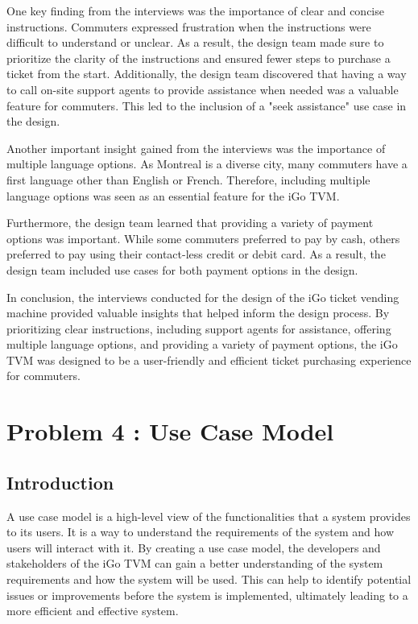 \documentclass[letterpaper]{report}
\begin{document}
One key finding from the interviews was the importance of clear and concise instructions. Commuters expressed frustration when the instructions were difficult to understand or unclear. As a result, the design team made sure to prioritize the clarity of the instructions and ensured fewer steps to purchase a ticket from the start. Additionally, the design team discovered that having a way to call on-site support agents to provide assistance when needed was a valuable feature for commuters. This led to the inclusion of a "seek assistance" use case in the design.
\vspace{\baselineskip}

Another important insight gained from the interviews was the importance of multiple language options. As Montreal is a diverse city, many commuters have a first language other than English or French. Therefore, including multiple language options was seen as an essential feature for the iGo TVM.
\vspace{\baselineskip}

Furthermore, the design team learned that providing a variety of payment options was important. While some commuters preferred to pay by cash, others preferred to pay using their contact-less credit or debit card. As a result, the design team included use cases for both payment options in the design.
\vspace{\baselineskip}

In conclusion, the interviews conducted for the design of the iGo ticket vending machine provided valuable insights that helped inform the design process. By prioritizing clear instructions, including support agents for assistance, offering multiple language options, and providing a variety of payment options, the iGo TVM was designed to be a user-friendly and efficient ticket purchasing experience for commuters.

\chapter{Problem 4 : Use Case Model}
\section{Introduction}
 A use case model is a high-level view of the functionalities that a system provides to its users. It is a way to understand the requirements of the system and how users will interact with it. By creating a use case model, the developers and stakeholders of the iGo TVM can gain a better understanding of the system requirements and how the system will be used. This can help to identify potential issues or improvements before the system is implemented, ultimately leading to a more efficient and effective system.
\end{document}
